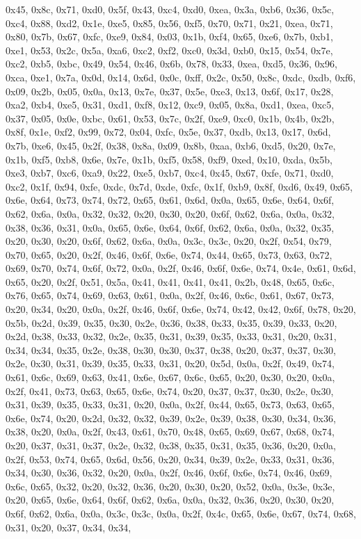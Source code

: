 \documentclass[
]{book}
\begin{document}
0x45, 0x8c, 0x71, 0xd0, 0x5f, 0x43, 0xc4, 0xd0, 0xea, 0x3a, 0xb6, 0x36, 0x5c, 0xc4, 0x88, 0xd2, 0x1e, 0xe5, 0x85, 0x56, 0xf5, 0x70, 0x71, 0x21, 0xea, 0x71, 0x80, 0x7b, 0x67, 0xfc, 0xe9, 0x84, 0x03, 0x1b, 0xf4, 0x65, 0xe6, 0x7b, 0xb1, 0xe1, 0x53, 0x2c, 0x5a, 0xa6, 0xc2, 0xf2, 0xc0, 0x3d, 0xb0, 0x15, 0x54, 0x7e, 0xc2, 0xb5, 0xbc, 0x49, 0x54, 0x46, 0x6b, 0x78, 0x33, 0xea, 0xd5, 0x36, 0x96, 0xca, 0xe1, 0x7a, 0x0d, 0x14, 0x6d, 0x0c, 0xff, 0x2c, 0x50, 0x8c, 0xdc, 0xdb, 0xf6, 0x09, 0x2b, 0x05, 0x0a, 0x13,
0x7e, 0x37, 0x5e, 0xe3, 0x13, 0x6f, 0x17, 0x28, 0xa2, 0xb4, 0xe5, 0x31, 0xd1, 0xf8, 0x12, 0xc9, 0x05, 0x8a, 0xd1, 0xea, 0xc5, 0x37, 0x05, 0x0e, 0xbc, 0x61, 0x53, 0x7c, 0x2f, 0xe9, 0xc0, 0x1b, 0x4b, 0x2b, 0x8f, 0x1e, 0xf2, 0x99, 0x72, 0x04, 0xfc, 0x5e, 0x37, 0xdb, 0x13, 0x17, 0x6d, 0x7b, 0xe6, 0x45, 0x2f, 0x38, 0x8a, 0x09, 0x8b, 0xaa, 0xb6, 0xd5, 0x20, 0x7e, 0x1b, 0xf5, 0xb8, 0x6e, 0x7e, 0x1b, 0xf5, 0x58, 0xf9, 0xed, 0x10, 0xda, 0x5b, 0xe3, 0xb7, 0xc6, 0xa9, 0x22, 0xe5, 0xb7, 0xc4, 0x45, 0x67, 0xfe,
0x71, 0xd0, 0xc2, 0x1f, 0x94, 0xfe, 0xdc, 0x7d, 0xde, 0xfc, 0x1f, 0xb9, 0x8f, 0xd6, 0x49, 0x65, 0x6e, 0x64, 0x73, 0x74, 0x72, 0x65, 0x61, 0x6d, 0x0a, 0x65, 0x6e, 0x64, 0x6f, 0x62, 0x6a, 0x0a, 0x32, 0x32, 0x20, 0x30, 0x20, 0x6f, 0x62, 0x6a, 0x0a, 0x32, 0x38, 0x36, 0x31, 0x0a, 0x65, 0x6e, 0x64, 0x6f, 0x62, 0x6a, 0x0a, 0x32, 0x35, 0x20, 0x30, 0x20, 0x6f, 0x62, 0x6a, 0x0a, 0x3c, 0x3c, 0x20, 0x2f, 0x54, 0x79, 0x70, 0x65, 0x20, 0x2f, 0x46, 0x6f, 0x6e, 0x74, 0x44, 0x65, 0x73, 0x63, 0x72, 0x69, 0x70, 0x74,
0x6f, 0x72, 0x0a, 0x2f, 0x46, 0x6f, 0x6e, 0x74, 0x4e, 0x61, 0x6d, 0x65, 0x20, 0x2f, 0x51, 0x5a, 0x41, 0x41, 0x41, 0x41, 0x2b, 0x48, 0x65, 0x6c, 0x76, 0x65, 0x74, 0x69, 0x63, 0x61, 0x0a, 0x2f, 0x46, 0x6c, 0x61, 0x67, 0x73, 0x20, 0x34, 0x20, 0x0a, 0x2f, 0x46, 0x6f, 0x6e, 0x74, 0x42, 0x42, 0x6f, 0x78, 0x20, 0x5b, 0x2d, 0x39, 0x35, 0x30, 0x2e, 0x36, 0x38, 0x33, 0x35, 0x39, 0x33, 0x20, 0x2d, 0x38, 0x33, 0x32, 0x2e, 0x35, 0x31, 0x39, 0x35, 0x33, 0x31, 0x20, 0x31, 0x34, 0x34, 0x35, 0x2e, 0x38, 0x30, 0x30,
0x37, 0x38, 0x20, 0x37, 0x37, 0x30, 0x2e, 0x30, 0x31, 0x39, 0x35, 0x33, 0x31, 0x20, 0x5d, 0x0a, 0x2f, 0x49, 0x74, 0x61, 0x6c, 0x69, 0x63, 0x41, 0x6e, 0x67, 0x6c, 0x65, 0x20, 0x30, 0x20, 0x0a, 0x2f, 0x41, 0x73, 0x63, 0x65, 0x6e, 0x74, 0x20, 0x37, 0x37, 0x30, 0x2e, 0x30, 0x31, 0x39, 0x35, 0x33, 0x31, 0x20, 0x0a, 0x2f, 0x44, 0x65, 0x73, 0x63, 0x65, 0x6e, 0x74, 0x20, 0x2d, 0x32, 0x32, 0x39, 0x2e, 0x39, 0x38, 0x30, 0x34, 0x36, 0x38, 0x20, 0x0a, 0x2f, 0x43, 0x61, 0x70, 0x48, 0x65, 0x69, 0x67, 0x68, 0x74,
0x20, 0x37, 0x31, 0x37, 0x2e, 0x32, 0x38, 0x35, 0x31, 0x35, 0x36, 0x20, 0x0a, 0x2f, 0x53, 0x74, 0x65, 0x6d, 0x56, 0x20, 0x34, 0x39, 0x2e, 0x33, 0x31, 0x36, 0x34, 0x30, 0x36, 0x32, 0x20, 0x0a, 0x2f, 0x46, 0x6f, 0x6e, 0x74, 0x46, 0x69, 0x6c, 0x65, 0x32, 0x20, 0x32, 0x36, 0x20, 0x30, 0x20, 0x52, 0x0a, 0x3e, 0x3e, 0x20, 0x65, 0x6e, 0x64, 0x6f, 0x62, 0x6a, 0x0a, 0x32, 0x36, 0x20, 0x30, 0x20, 0x6f, 0x62, 0x6a, 0x0a, 0x3c, 0x3c, 0x0a, 0x2f, 0x4c, 0x65, 0x6e, 0x67, 0x74, 0x68, 0x31, 0x20, 0x37, 0x34, 0x34,
\end{document}
